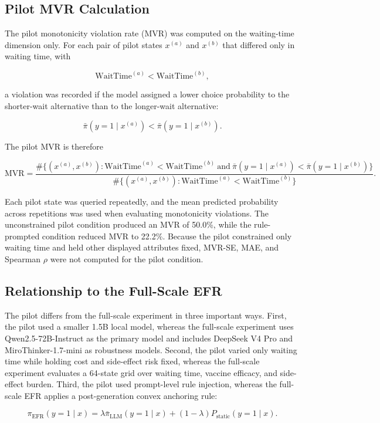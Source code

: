 \documentclass[11pt]{article}
\begin{document}
\subsection{Pilot MVR Calculation}

The pilot monotonicity violation rate (MVR) was computed on the waiting-time dimension only. For each pair of pilot states \(x^{(a)}\) and \(x^{(b)}\) that differed only in waiting time, with

\[
\text{WaitTime}^{(a)} < \text{WaitTime}^{(b)},
\]

a violation was recorded if the model assigned a lower choice probability to the shorter-wait alternative than to the longer-wait alternative:

\[
\bar{\pi}(y=1 \mid x^{(a)})
<
\bar{\pi}(y=1 \mid x^{(b)}).
\]

The pilot MVR is therefore

\[
\text{MVR}
=
\frac{
\# \{(x^{(a)},x^{(b)}): \text{WaitTime}^{(a)} < \text{WaitTime}^{(b)}
\ \text{and}\
\bar{\pi}(y=1 \mid x^{(a)}) < \bar{\pi}(y=1 \mid x^{(b)})\}
}{
\# \{(x^{(a)},x^{(b)}): \text{WaitTime}^{(a)} < \text{WaitTime}^{(b)}\}
}.
\]

Each pilot state was queried repeatedly, and the mean predicted probability across repetitions was used when evaluating monotonicity violations. The unconstrained pilot condition produced an MVR of 50.0\%, while the rule-prompted condition reduced MVR to 22.2\%. Because the pilot constrained only waiting time and held other displayed attributes fixed, MVR-SE, MAE, and Spearman \(\rho\) were not computed for the pilot condition.

\subsection{Relationship to the Full-Scale EFR}

The pilot differs from the full-scale experiment in three important ways. First, the pilot used a smaller 1.5B local model, whereas the full-scale experiment uses Qwen2.5-72B-Instruct as the primary model and includes DeepSeek V4 Pro and MiroThinker-1.7-mini as robustness models. Second, the pilot varied only waiting time while holding cost and side-effect risk fixed, whereas the full-scale experiment evaluates a 64-state grid over waiting time, vaccine efficacy, and side-effect burden. Third, the pilot used prompt-level rule injection, whereas the full-scale EFR applies a post-generation convex anchoring rule:

\[
\pi_{\text{EFR}}(y=1 \mid x)
=
\lambda \bar{\pi}_{\text{LLM}}(y=1 \mid x)
+
(1-\lambda)P_{\text{static}}(y=1 \mid x).
\]
\end{document}
